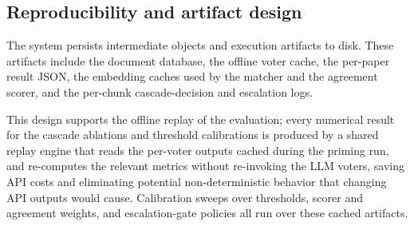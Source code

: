 \subsection{Reproducibility and artifact design}\label{subsec:overview-reproducibility-and-artifact-design}

The system persists intermediate objects and execution artifacts to disk. These artifacts include the document database, the offline voter cache, the per-paper result JSON, the embedding caches used by the matcher and the agreement scorer, and the per-chunk cascade-decision and escalation logs. 

This design supports the offline replay of the evaluation; every numerical result for the cascade ablations and threshold calibrations is produced by a shared replay engine that reads the per-voter outputs cached during the priming run, and re-computes the relevant metrics without re-invoking the LLM voters, saving API costs and eliminating potential non-deterministic behavior that changing API outputs would cause. Calibration sweeps over thresholds, scorer and agreement weights, and escalation-gate policies all run over these cached artifacts. 
